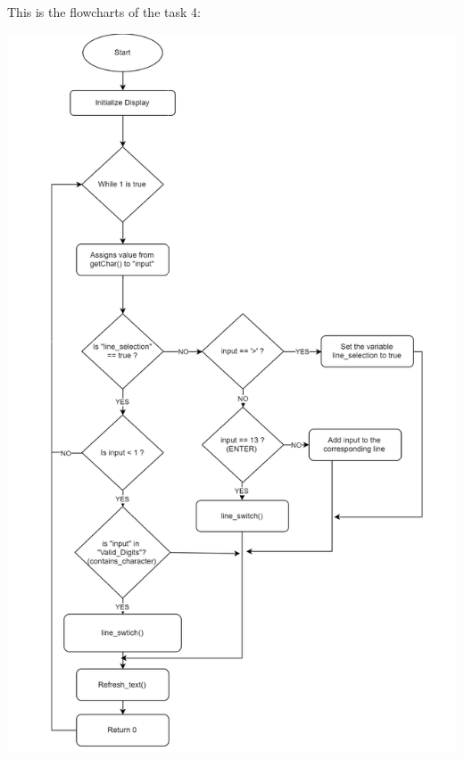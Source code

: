 \documentclass[a4paper,12pt]{article}
\begin{document}
This is the flowcharts of the task 4:
\begin{center}
\includegraphics[scale=0.5]{img/Task4.png}
\end{center}
\end{document}
